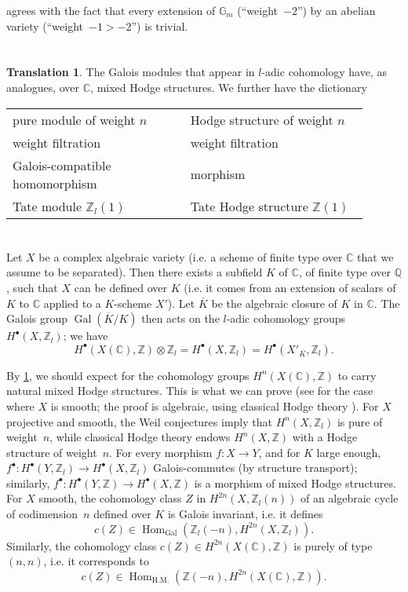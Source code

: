 \documentclass{article}
\theoremstyle{plain}
\theoremstyle{definition}
\newtheorem*{translation*}{Translation}
\newcommand{\ZZ}{\mathbb{Z}}
\newcommand{\QQ}{\mathbb{Q}}
\newcommand{\CC}{\mathbb{C}}
\DeclareMathOperator{\Gal}{Gal}
\DeclareMathOperator{\Hom}{Hom}
\newcommand{\oldpage}[1]{\marginpar{\footnotesize$\Big\vert$ \textit{p.~#1}}}
\begin{document}
 agrees with the fact that every extension of $\mathbb{G}_m$ (``weight~$-2$'') by an abelian variety (``weight~$-1>-2$'') is trivial.


\section{}
\label{3}

\begin{translation*}
  The Galois modules that appear in $l$-adic cohomology have, as analogues, over $\CC$, mixed Hodge structures.
  We further have the dictionary
  
  \bigskip\noindent
  \begin{tabular}{p{0.45\linewidth}|p{0.45\linewidth}}
    \toprule
    pure module of weight $n$
    & Hodge structure of weight $n$
  \\weight filtration
    & weight filtration
  \\Galois-compatible homomorphism
    & morphism
  \\Tate module $\ZZ_l(1)$
    & Tate Hodge structure $\ZZ(1)$
  \\\bottomrule
  \end{tabular}
\end{translation*}


\section{}
\label{4}

Let $X$ be a complex algebraic variety (i.e. a scheme of finite type over $\CC$ that we assume to be separated).
Then there exists a subfield $K$ of $\CC$, of finite type over $\QQ$, such that $X$ can be defined over $K$ (i.e. it comes from an extension of scalars of $K$ to $\CC$ applied to a $K$-scheme $X'$).
Let $\overline{K}$ be the algebraic closure of $K$ in $\CC$.
The Galois group $\Gal(\overline{K}/K)$ then acts on the $l$-adic cohomology groups $H^\bullet(X,\ZZ_l)$;
we have
\[
  H^\bullet(X(\CC),\ZZ)\otimes\ZZ_l
  = H^\bullet(X,\ZZ_l)
  = H^\bullet(X'_{\overline{K}},\ZZ_l).
\]

\oldpage{427}
By \cref{3}, we should expect for the cohomology groups $H^n(X(\CC),\ZZ)$ to carry natural mixed Hodge structures.
This is what we can prove (see \cite[3.2.5]{1} for the case where $X$ is smooth; the proof is algebraic, using classical Hodge theory \cite{6}).
For $X$ projective and smooth, the Weil conjectures imply that $H^n(X,\ZZ_l)$ is pure of weight~$n$, while classical Hodge theory endows $H^n(X,\ZZ)$ with a Hodge structure of weight~$n$.
For every morphism $f\colon X\to Y$, and for $K$ large enough, $f^\bullet\colon H^\bullet(Y,\ZZ_l)\to H^\bullet(X,\ZZ_l)$ Galois-commutes (by structure transport);
similarly, $f^\bullet\colon H^\bullet(Y,\ZZ)\to H^\bullet(X,\ZZ)$ is a morphism of mixed Hodge structures.
For $X$ smooth, the cohomology class $Z$ in $H^{2n}(X,\ZZ_l(n))$ of an algebraic cycle of codimension~$n$ defined over $K$ is Galois invariant, i.e. it defines
\[
  c(Z) \in \Hom_{\Gal}(\ZZ_l(-n),H^{2n}(X,\ZZ_l)).
\]
Similarly, the cohomology class $c(Z)\in H^{2n}(X(\CC),\ZZ)$ is purely of type~$(n,n)$, i.e. it corresponds to
\[
  c(Z) \in \Hom_{\mathrm{H.M.}}(\ZZ(-n),H^{2n}(X(\CC),\ZZ)).
\]
\end{document}
